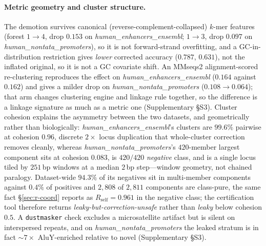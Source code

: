 \documentclass[webpdf,modern,large,namedate]{oup-authoring-template}%
\begin{document}
\paragraph{Metric geometry and cluster structure.} The demotion survives canonical (reverse-complement-collapsed) $k$-mer features (forest $1\to4$, drop $0.153$ on \textit{human\_enhancers\_ensembl}; $1\to3$, drop $0.097$ on \textit{human\_nontata\_promoters}), so it is not forward-strand overfitting, and a GC-in-distribution restriction gives \emph{lower} corrected accuracy ($0.787$, $0.631$), not the inflated original, so it is not a GC covariate shift. An MMseqs2 alignment-scored re-clustering reproduces the effect on \textit{human\_enhancers\_ensembl} ($0.164$ against $0.162$) and gives a milder drop on \textit{human\_nontata\_promoters} ($0.108\to0.064$); that arm changes clustering engine and linkage rule together, so the difference is a linkage signature as much as a metric one (Supplementary \S S3). Cluster cohesion explains the asymmetry between the two datasets, and geometrically rather than biologically: \textit{human\_enhancers\_ensembl}'s clusters are $99.6\%$ pairwise at cohesion $0.96$, discrete $2\times$ locus duplication that whole-cluster correction removes cleanly, whereas \textit{human\_nontata\_promoters}'s $420$-member largest component sits at cohesion $0.083$, is $420/420$ \emph{negative} class, and is a single locus tiled by $251$\,bp windows at a median $2$\,bp step---window geometry, not chained paralogy. Dataset-wide $94.3\%$ of its negatives sit in multi-member components against $0.4\%$ of positives and $2{,}808$ of $2{,}811$ components are class-pure, the same fact \S\ref{sec:r-coord} reports as $R_{\mathrm{self}}=0.961$ in the negative class; the certification tool therefore returns \emph{leaky-but-correction-unsafe} rather than \emph{leaky} below cohesion $0.5$. A \texttt{dustmasker} check excludes a microsatellite artifact but is silent on interspersed repeats, and on \textit{human\_nontata\_promoters} the leaked stratum is in fact ${\sim}7\times$ AluY-enriched relative to novel (Supplementary \S S3).
\end{document}
